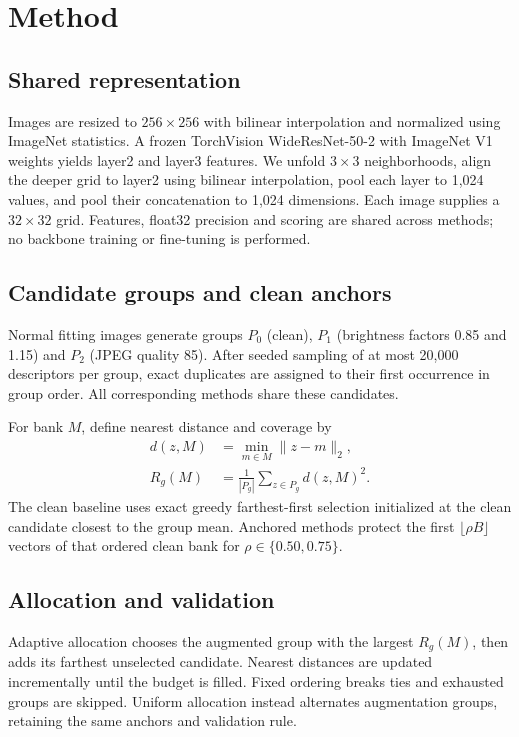 \documentclass[10pt,twocolumn,letterpaper]{article}
\begin{document}
\section{Method}
\subsection{Shared representation}
Images are resized to $256\times256$ with bilinear interpolation and normalized using ImageNet statistics. A frozen TorchVision WideResNet-50-2 with ImageNet V1 weights yields layer2 and layer3 features. We unfold $3\times3$ neighborhoods, align the deeper grid to layer2 using bilinear interpolation, pool each layer to 1,024 values, and pool their concatenation to 1,024 dimensions. Each image supplies a $32\times32$ grid. Features, float32 precision and scoring are shared across methods; no backbone training or fine-tuning is performed.

\subsection{Candidate groups and clean anchors}
Normal fitting images generate groups $P_0$ (clean), $P_1$ (brightness factors 0.85 and 1.15) and $P_2$ (JPEG quality 85). After seeded sampling of at most 20,000 descriptors per group, exact duplicates are assigned to their first occurrence in group order. All corresponding methods share these candidates.

For bank $M$, define nearest distance and coverage by
\begin{equation}
 \begin{aligned}
 d(z,M)&=\min_{m\in M}\|z-m\|_2,\\
 R_g(M)&=\frac{1}{|P_g|}\sum_{z\in P_g}d(z,M)^2.
 \end{aligned}
\end{equation}
The clean baseline uses exact greedy farthest-first selection initialized at the clean candidate closest to the group mean. Anchored methods protect the first $\lfloor\rho B\rfloor$ vectors of that ordered clean bank for $\rho\in\{0.50,0.75\}$.

\subsection{Allocation and validation}
Adaptive allocation chooses the augmented group with the largest $R_g(M)$, then adds its farthest unselected candidate. Nearest distances are updated incrementally until the budget is filled. Fixed ordering breaks ties and exhausted groups are skipped. Uniform allocation instead alternates augmentation groups, retaining the same anchors and validation rule.
\end{document}
